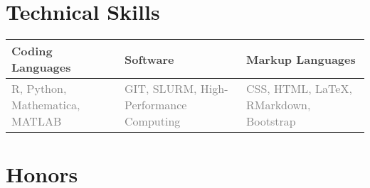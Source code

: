 \documentclass[11pt,a4paper,]{awesome-cv}
\begin{document}
\begin{cventries}
\end{cventries}

\hypertarget{technical-skills}{%
\section{Technical Skills}\label{technical-skills}}

\begin{table}[!h]
\centering\begingroup\fontsize{9}{11}\selectfont

\begin{tabular}{>{\centering\arraybackslash}p{4.75cm}>{\centering\arraybackslash}p{4.75cm}>{\centering\arraybackslash}p{4.75cm}}
\toprule
\textcolor[HTML]{414141}{\textbf{Coding Languages}} & \textcolor[HTML]{414141}{\textbf{Software}} & \textcolor[HTML]{414141}{\textbf{Markup Languages}}\\
\midrule
\textcolor[HTML]{7f7f7f}{R, Python, Mathematica, MATLAB} & \textcolor[HTML]{7f7f7f}{GIT, SLURM, High-Performance Computing} & \textcolor[HTML]{7f7f7f}{CSS, HTML, \LaTeX, RMarkdown, Bootstrap}\\
\bottomrule
\end{tabular}
\endgroup{}
\end{table}

\hypertarget{honors}{%
\section{Honors}\label{honors}}
\end{document}
